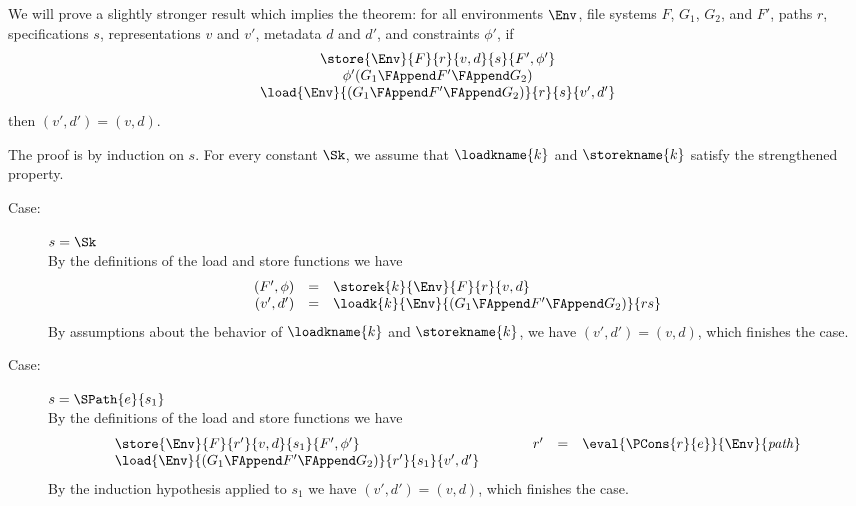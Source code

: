 %
{ We will prove a slightly stronger result which implies the theorem:
  for all environments $\Env$, file systems $F$, $G_1$, $G_2$, and
  $F'$, paths $r$, specifications $s$, representations $v$ and $v'$,
  metadata $d$ and $d'$, and constraints $\phi'$, if 
%
\[
\begin{array}{c}
  \store{\Env}{F}{r}{v,d}{s}{F',\phi'}\\
  \phi'(G_1 \FAppend F' \FAppend G_2)\\
  \load{\Env}{(G_1 \FAppend F' \FAppend G_2)}{r}{s}{v',d'}
\end{array}
\]
%
then $(v',d') = (v,d)$. 

The proof is by induction on $s$. For every constant $\Sk$, we assume
that $\loadkname{k}$ and $\storekname{k}$ satisfy the strengthened
property.
\begin{description}
\item[Case:] $s = \Sk$\\[1ex]
%
By the definitions of the load and store functions we have 
\[ 
\begin{array}{rcll}
(F',\phi) &=& \storek{k}{\Env}{F}{r}{v,d}\\
(v',d')  &=& \loadk{k}{\Env}{(G_1 \FAppend F' \FAppend G_2)}{rs}\\
\end{array}
\]
By assumptions about the behavior of $\loadkname{k}$ and
$\storekname{k}$, we have $(v',d') = (v,d)$, which finishes the case.

\item[Case:] $s=\SPath{e}{s_1}$\\[1ex]
%
By the definitions of the load and store functions we have
\[
\begin{array}{l}
\store{\Env}{F}{r'}{v,d}{s_1}{F',\phi'}\\
\load{\Env}{(G_1 \FAppend F' \FAppend G_2)}{r'}{s_1}{v',d'}
\end{array}\hspace*{1cm}\begin{array}{rcl}
r' &=& \eval{\PCons{r}{e}}{\Env}{\mathit{path}}\\
\\
\end{array}
\]
%
By the induction hypothesis applied to $s_1$ we have $(v',d') =
(v,d)$, which finishes the case.


\end{description}}
